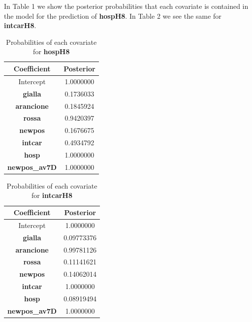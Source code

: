 \documentclass[12pt,a4paper]{article}
\theoremstyle{definition}
\theoremstyle{remark}
\begin{document}
In Table 1 we show the posterior probabilities that each covariate is contained in the model for the prediction of \textbf{hospH8}. In Table 2 we see the same for \textbf{intcarH8}.
\begin{table}[!htb]
	\centering
	\begin{tabular}{|c|c|}
		\hline
		Coefficient          & Posterior \\ \hline
		Intercept          & 1.0000000                   \\ \hline
		\textbf{gialla}    & 0.1736033                  \\ \hline
		\textbf{arancione} & 0.1845924                   \\ \hline
		\textbf{rossa}     & 0.9420397                     \\ \hline
		\textbf{newpos}    & 0.1676675                  \\ \hline
		\textbf{intcar}    & 0.4934792                \\ \hline
		\textbf{hosp}      & 1.0000000        \\ \hline
			\textbf{newpos\_av7D}      & 1.0000000        \\ \hline
	\end{tabular}
	\caption{Probabilities of each covariate for \textbf{hospH8}}
\end{table}

\begin{table}[!htb]
	\centering
	\begin{tabular}{|c|c|}
		\hline
		Coefficient          & Posterior \\ \hline
		Intercept          & 1.0000000                   \\ \hline
		\textbf{gialla}    &0.09773376                 \\ \hline
		\textbf{arancione} & 0.99781126               \\ \hline
		\textbf{rossa}     &0.11141621                 \\ \hline
		\textbf{newpos}    &0.14062014             \\ \hline
		\textbf{intcar}    &1.0000000            \\ \hline
		\textbf{hosp}      &0.08919494       \\ \hline
		\textbf{newpos\_av7D}      & 1.0000000        \\ \hline
	\end{tabular}
	\caption{Probabilities of each covariate for \textbf{intcarH8}}
\end{table}
\end{document}
